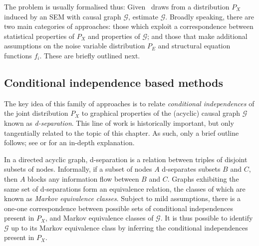 
The problem is usually formalised thus: Given \iid~draws from a distribution $P_X$ induced by an SEM with causal graph $\mathcal{G}$, estimate $\mathcal{G}$.
Broadly speaking, there are two main categories of approaches: those which exploit a correspondence between statistical properties of $P_X$ and properties of $\mathcal{G}$; and those that make additional assumptions on the noise variable distribution $P_E$ and structural equation functions $f_i$.
These are briefly outlined next.

\subsection{Conditional independence based methods}

The key idea of this family of approaches is to relate \emph{conditional independences} of the joint distribution $P_X$ to graphical properties of the (acyclic) causal graph $\mathcal{G}$ known as \emph{d-separation}.
This line of work is historically important, but only tangentially related to the topic of this chapter.
As such, only a brief outline follows; see \cite{pearl2009causality} or \cite{peters2017elements} for an in-depth explanation.

In a directed acyclic graph, d-separation is a relation between triples of disjoint subsets of nodes. 
Informally, if a subset of nodes $A$ d-separates subsets $B$ and $C$, then $A$ blocks any information flow between $B$ and $C$. 
Graphs exhibiting the same set of d-separations form an equivalence relation, the classes of which are known as \emph{Markov equivalence classes}.
Subject to mild assumptions, there is a one-one correspondence between possible sets of conditional independences present in $P_X$, and Markov equivalence classes of $\mathcal{G}$. 
It is thus possible to identify $\mathcal{G}$ up to its Markov equivalence class by inferring the conditional independences present in $P_X$.

